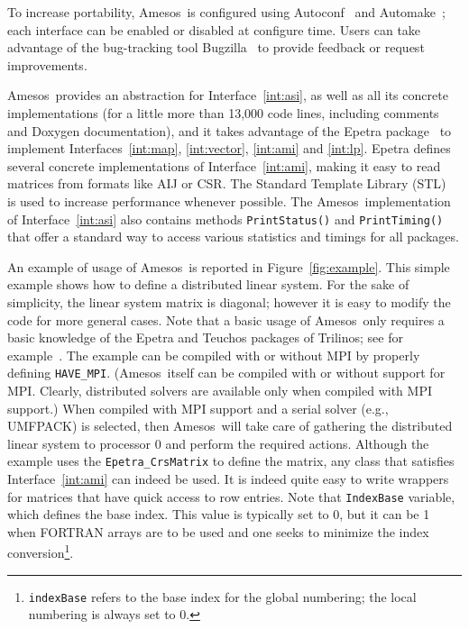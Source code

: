 \documentclass[acmtoms,acmnow]{acmtrans2m}
\newcommand{\amesos}{{\sc Amesos}}
\begin{document}
To increase portability, \amesos\ is configured using
Autoconf~\cite{Autoconf} and Automake~\cite{Automake}; each
interface can be enabled or disabled at configure time. Users can
take advantage of the bug-tracking tool Bugzilla~\cite{Bugzilla} to
provide feedback or request improvements.

\medskip

\amesos\ provides an abstraction for Interface~\ref{int:asi}, as
well as all its concrete implementations (for a little more than
13,000 code lines, including comments and Doxygen
documentation), and it takes advantage of the {\sc Epetra}
package~\cite{Epetra-Ref-Guide} to implement
Interfaces~\ref{int:map}, \ref{int:vector}, \ref{int:ami} and
\ref{int:lp}. {\sc Epetra} defines several concrete implementations
of Interface~\ref{int:ami}, making it easy to read matrices from
formats
  like AIJ or CSR.
The Standard Template Library (STL)~\cite{wise96overview} is used to
increase performance whenever possible. The \amesos\ implementation
of Interface~\ref{int:asi} also contains methods {\tt PrintStatus()}
and {\tt PrintTiming()} that offer a standard way to access various
statistics and timings for all packages.

An example of usage of \amesos\ is reported in
Figure~\ref{fig:example}. This simple example shows how to define a
distributed linear system. For the sake of simplicity, the linear
system matrix is diagonal; however it is easy to modify the code for
more general cases. Note that a basic usage of \amesos\ only
requires a basic knowledge of the Epetra and Teuchos packages of
Trilinos; see for example~\cite{Trilinos-Tutorial}. The example can
be compiled with or without MPI by properly defining \verb!HAVE_MPI!.
(\amesos\ itself can be compiled with or without support for MPI.
Clearly, distributed solvers are available only when compiled with
MPI support.) When compiled with MPI support and a serial solver
(e.g., UMFPACK) is selected, then \amesos\ will take care of
gathering the distributed linear system to processor 0 and perform
the required actions. Although the example uses the
\verb!Epetra_CrsMatrix! to define the matrix, any class that
satisfies Interface~\ref{int:ami} can indeed be used. It is indeed
quite easy to write wrappers for matrices that have quick access to
row entries. Note that \verb!IndexBase! variable, which defines the
base index. This value is typically set to 0, but it can  be 1 when
FORTRAN arrays are to be used and one seeks to minimize the index
conversion\footnote{{\tt indexBase} refers to the base index for the
global numbering; the local numbering is always set to 0.}.
\end{document}
